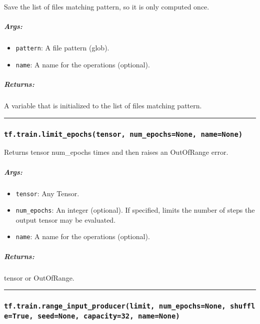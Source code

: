Save the list of files matching pattern, so it is only computed once.

\subparagraph{Args: }\label{args-58}

\begin{itemize}
\tightlist
\item
  \texttt{pattern}: A file pattern (glob).
\item
  \texttt{name}: A name for the operations (optional).
\end{itemize}

\subparagraph{Returns: }\label{returns-49}

A variable that is initialized to the list of files matching pattern.

\begin{center}\rule{0.5\linewidth}{\linethickness}\end{center}

\subsubsection{\texorpdfstring{\texttt{tf.train.limit\_epochs(tensor,\ num\_epochs=None,\ name=None)}
}{tf.train.limit\_epochs(tensor, num\_epochs=None, name=None) }}\label{tf.train.limitux5fepochstensor-numux5fepochsnone-namenone}

Returns tensor num\_epochs times and then raises an OutOfRange error.

\subparagraph{Args: }\label{args-59}

\begin{itemize}
\tightlist
\item
  \texttt{tensor}: Any Tensor.
\item
  \texttt{num\_epochs}: An integer (optional). If specified, limits the
  number of steps the output tensor may be evaluated.
\item
  \texttt{name}: A name for the operations (optional).
\end{itemize}

\subparagraph{Returns: }\label{returns-50}

tensor or OutOfRange.

\begin{center}\rule{0.5\linewidth}{\linethickness}\end{center}

\subsubsection{\texorpdfstring{\texttt{tf.train.range\_input\_producer(limit,\ num\_epochs=None,\ shuffle=True,\ seed=None,\ capacity=32,\ name=None)}
}{tf.train.range\_input\_producer(limit, num\_epochs=None, shuffle=True, seed=None, capacity=32, name=None) }}\label{tf.train.rangeux5finputux5fproducerlimit-numux5fepochsnone-shuffletrue-seednone-capacity32-namenone}

